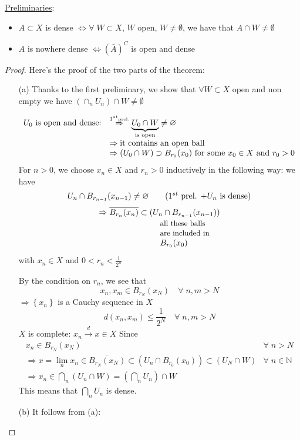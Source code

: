 \noindent\underline{Preliminaries}:
\begin{itemize}
    \item \(A \subset X\) is dense \(\Leftrightarrow \forall \; W \subset X\), \(W\) open, \(W \neq \emptyset\), we have that \(A \cap W \neq \emptyset\)
    \item \(A\) is nowhere dense \(\Leftrightarrow \left(\bar{A}\right)^C\) is open and dense
\end{itemize}

\begin{proof} Here's the proof of the two parts of the theorem:
    \begin{itemize}
        \item[(a)] Thanks to the first preliminary, we show that \(\forall W \subset X\) open and non empty we have \((\cap_n U_n) \cap W \neq \emptyset\)
        
        \[
            \begin{array}{rl}
                U_0 \text{ is open and dense:} & \overset{1^{st}\text{\tiny{prel.}}}{\Rightarrow} \underbrace{U_0 \cap W}_{\text{is open}} \neq \emptyset \\
                & \Rightarrow \text{it contains an open ball} \\
                & \Rightarrow (U_0 \cap W) \supset B_{r_0}(x_0) \mbox{ for some } x_0 \in X \mbox{ and } r_0 > 0
        \end{array}
        \] 
        For \(n>0\), we choose \(x_n \in X\) and \(r_n > 0\) inductively in the following way: we have 
        \[
            U_n \cap B_{r_{n-1}}(x_{n-1}) \neq \emptyset 
        \tag*{(\(1^{st}\) prel. \(+ U_n\) is dense)}\]
        \[
            \Rightarrow \overline{B_{r_n}(x_n)} \subset \underset{\begin{array}{l}\text{\small{all these balls}} \\ \text{\small{are included in}} \\
            \displaystyle{B_{r_0}(x_0)}\end{array}}{(U_n \cap B_{r_{n-1}}(x_{n-1}))}
        \]
        with \(x_n \in X\) and \(0 < r_n < \frac{1}{2^n}\)

        By the condition on \(r_n\), we see that 
        \[
            x_n, x_m \in B_{r_N}(x_N) \quad \forall \; n,m > N
        \]
        \(\Rightarrow \left\{ x_n \right\}\) is a Cauchy sequence in \(X\)
        \[
            d(x_n, x_m) \leq \frac{1}{2^N} \quad \forall \; n,m > N
        \]
        \(X\) is complete: \(x_n \overset{d}{\rightarrow} x \in X\)
        Since 
        \[
            \begin{array}{lr}
                x_n \in B_{r_N}(x_N) & \forall \; n > N \\
                \Rightarrow x = \lim_n x_n \in \overline{B_{r_N}(x_N)} \subset (U_n \cap B_{r_0}(x_0)) \subset (U_N \cap W) & \forall \; n \in \mathbb{N} \\
                \Rightarrow x_n \in \bigcap_n (U_n \cap W) = \left(\bigcap_n U_n\right) \cap W
            \end{array}
        \]
        This means that \(\bigcap_n U_n\) is dense.
        \item[(b)] It follows from (a):
        

\end{itemize}
\end{proof}
